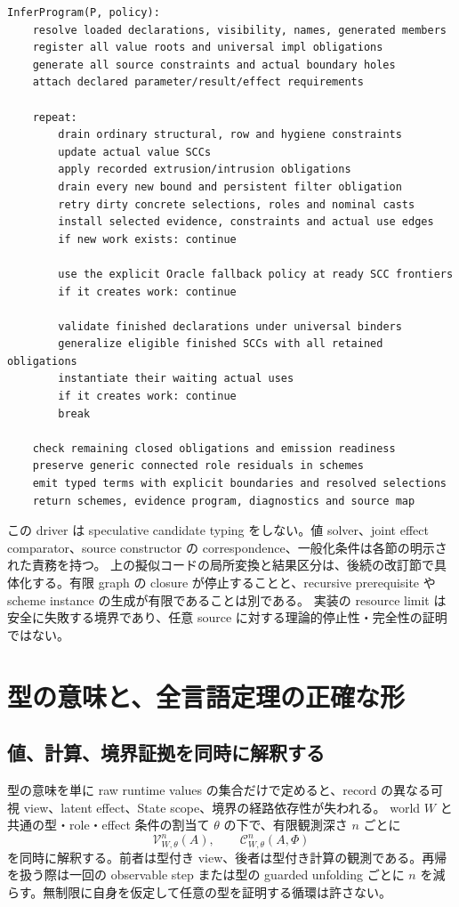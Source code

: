 \documentclass[11pt,a4paper]{article}
\theoremstyle{remark}
\begin{document}
\begin{Verbatim}[fontsize=\small]
InferProgram(P, policy):
    resolve loaded declarations, visibility, names, generated members
    register all value roots and universal impl obligations
    generate all source constraints and actual boundary holes
    attach declared parameter/result/effect requirements

    repeat:
        drain ordinary structural, row and hygiene constraints
        update actual value SCCs
        apply recorded extrusion/intrusion obligations
        drain every new bound and persistent filter obligation
        retry dirty concrete selections, roles and nominal casts
        install selected evidence, constraints and actual use edges
        if new work exists: continue

        use the explicit Oracle fallback policy at ready SCC frontiers
        if it creates work: continue

        validate finished declarations under universal binders
        generalize eligible finished SCCs with all retained obligations
        instantiate their waiting actual uses
        if it creates work: continue
        break

    check remaining closed obligations and emission readiness
    preserve generic connected role residuals in schemes
    emit typed terms with explicit boundaries and resolved selections
    return schemes, evidence program, diagnostics and source map
\end{Verbatim}

この driver は speculative candidate typing をしない。値 solver、joint effect comparator、source constructor の correspondence、一般化条件は各節の明示された責務を持つ。
上の擬似コードの局所変換と結果区分は、後続の改訂節で具体化する。有限 graph の closure が停止することと、recursive prerequisite や scheme instance の生成が有限であることは別である。
実装の resource limit は安全に失敗する境界であり、任意 source に対する理論的停止性・完全性の証明ではない。

\section{型の意味と、全言語定理の正確な形}

\subsection{値、計算、境界証拠を同時に解釈する}

型の意味を単に raw runtime values の集合だけで定めると、record の異なる可視 view、latent effect、State scope、境界の経路依存性が失われる。
world $W$ と共通の型・role・effect 条件の割当て $\theta$ の下で、有限観測深さ $n$ ごとに
\[
\mathcal V^n_{W,\theta}(A),\qquad
\mathcal C^n_{W,\theta}(A,\Phi)
\]
を同時に解釈する。前者は型付き view、後者は型付き計算の観測である。再帰を扱う際は一回の observable step または型の guarded unfolding ごとに $n$ を減らす。無制限に自身を仮定して任意の型を証明する循環は許さない。
\end{document}
